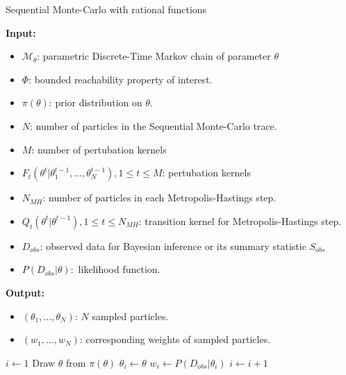 \begin{algorithm}[H]
      \caption{Sequential Monte-Carlo with rational functions}
      \label{rf-smc-alg}
      \hspace*{\algorithmicindent} \textbf{Input:}
      \begin{itemize}
            \item $\mathcal{M}_\theta$: parametric Discrete-Time Markov chain of parameter $\theta$
            \item $\Phi$: bounded reachability property of interest.
            \item $\pi(\theta)$: prior distribution on $\theta$.
            \item $N$: number of particles in the Sequential Monte-Carlo trace.
            \item $M$: number of pertubation kernels
            \item $F_t(\theta^t | \theta^{t-1}_1,\ldots,\theta^{t-1}_N), 1\leq t \leq M$: pertubation kernels
            \item $N_{MH}$: number of particles in each Metropolis-Hastings step.
            \item $Q_t(\theta^t|\theta^{t-1}), 1 \leq t \leq N_{MH}$: transition kernel for Metropolis-Hastings step.
            \item $D_{obs}$: observed data for Bayesian inference or its summary statistic $S_{obs}$
            \item $P(D_{obs}|\theta):$ likelihood function.
      \end{itemize}
      \hspace*{\algorithmicindent} \textbf{Output:}
      \begin{itemize}
            \item $(\theta_1,\ldots,\theta_N)$: $N$ sampled particles.
            \item $(w_1,\ldots,w_N)$: corresponding weights of sampled particles.
      \end{itemize}
      \begin{algorithmic}[1]
            \State $i \leftarrow 1$
             
            \State Draw $\theta$ from $\pi(\theta)$
            \State $\theta_i \leftarrow \theta$
            \State $w_i \leftarrow P(D_{obs}|\theta_i)$
            \State $i \leftarrow i + 1$
            \EndWhile
      \end{algorithmic}
\end{algorithm}

